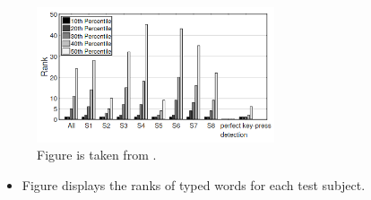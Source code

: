 \documentclass[ucs,9pt,usenames,dvipsnames]{beamer}
\begin{document}
 
 \begin{frame}
 	\begin{figure}
 		\centering
 		\includegraphics[width=7cm]{imgs/RankOfAverage.png}
 		\caption{Figure is taken from \cite{b1}.}
 	\end{figure}
 \begin{itemize}
	 \item Figure displays the ranks of typed words for each test subject.
	 
	 
	

\end{itemize}
\end{frame}
\end{document}
